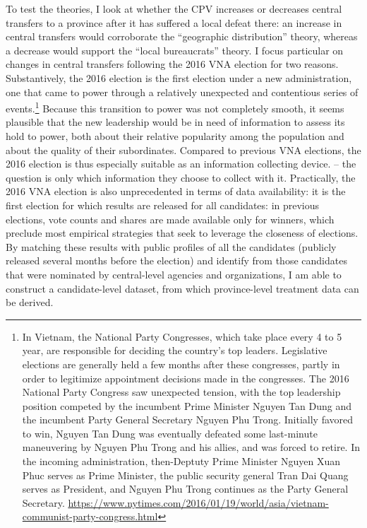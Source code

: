 \documentclass[12pt]{article}\usepackage[]{graphicx}\usepackage[]{color}
\newcommand{\1}{\mathbbm{1}}
\begin{document}
To test the theories, I look at whether the CPV increases or decreases central transfers to a province after it has suffered a local defeat there: an increase in central transfers would corroborate the ``geographic distribution'' theory, whereas a decrease would support the ``local bureaucrats'' theory. I focus particular on changes in central transfers following the 2016 VNA election for two reasons. Substantively, the 2016 election is the first election under a new administration, one that came to power through a relatively unexpected and contentious series of events.\footnote{In Vietnam, the National Party Congresses, which take place every 4 to 5 year, are responsible for deciding the country's top leaders. Legislative elections are generally held a few months after these congresses, partly in order to legitimize appointment decisions made in the congresses. The 2016 National Party Congress saw unexpected tension, with the top leadership position competed by the incumbent Prime Minister Nguyen Tan Dung and the incumbent Party General Secretary Nguyen Phu Trong. Initially favored to win, Nguyen Tan Dung was eventually defeated some last-minute maneuvering by Nguyen Phu Trong and his allies, and was forced to retire. In the incoming administration, then-Deptuty Prime Minister Nguyen Xuan Phuc serves as Prime Minister, the public security general Tran Dai Quang serves as President, and Nguyen Phu Trong continues as the Party General Secretary. \url{https://www.nytimes.com/2016/01/19/world/asia/vietnam-communist-party-congress.html}} Because this transition to power was not completely smooth, it seems plausible that the new leadership would be in need of information to assess its hold to power, both about their relative popularity among the population and about the quality of their subordinates. Compared to previous VNA elections, the 2016 election is thus especially suitable as an information collecting device. -- the question is only which information they choose to collect with it. Practically, the 2016 VNA election is also unprecedented in terms of data availability: it is the first election for which results are released for all candidates: in previous elections, vote counts and shares are made available only for winners, which preclude most empirical strategies that seek to leverage the closeness of elections. By matching these results with public profiles of all the candidates (publicly released several months before the election) and identify from those candidates that were nominated by central-level agencies and organizations, I am able to construct a candidate-level dataset, from which province-level treatment data can be derived.
\end{document}
